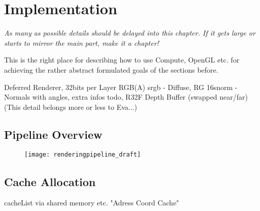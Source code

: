 \documentclass[thesis.tex]{subfiles}
\begin{document}
\section{Implementation}

\emph{As many as possible details should be delayed into this chapter. If it gets large or starts to mirror the main part, make it a chapter!}

This is the right place for describing how to use Compute, OpenGL etc. for achieving the rather abstract formulated goals of the sections before.

Deferred Renderer, 32bits per Layer RGB(A) srgb - Diffuse, RG 16snorm - Normals with angles, extra infos todo, R32F Depth Buffer (swapped near/far)\\
(This detail belongs more or less to Eva...)

\subsection{Pipeline Overview}

\begin{figure}[h]
	\centering
	\texttt{[image: renderingpipeline\_draft]}
\end{figure}



\subsection{Cache Allocation} \label{sec:impl:cachealloc}
cacheList via shared memory etc.
"Adress Coord Cache"

\subfilebib %
\end{document}

